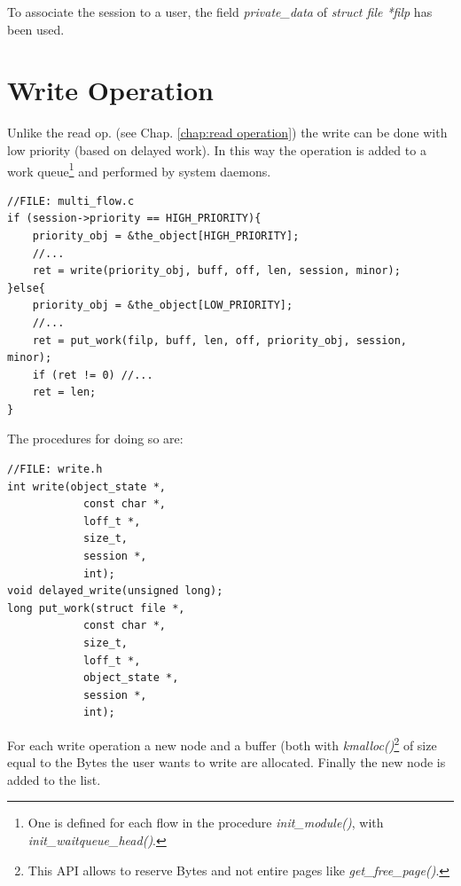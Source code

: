 \documentclass[12pt]{report}
\begin{document}
To associate the session to a user, the field \emph{private\_data} of \emph{struct file *filp} has been used. 



\section{Write Operation}
\label{chap:write operation}

Unlike the read op. (see Chap. \ref{chap:read operation}) the write can be done with low priority (based on delayed work). In this way the operation is added to a work queue\footnote{One is defined for each flow in the procedure \emph{init\_module()}, with  \emph{init\_waitqueue\_head()}.} and performed by system daemons.

\begin{lstlisting}
//FILE: multi_flow.c
if (session->priority == HIGH_PRIORITY){
	priority_obj = &the_object[HIGH_PRIORITY];
	//...	
	ret = write(priority_obj, buff, off, len, session, minor);
}else{
	priority_obj = &the_object[LOW_PRIORITY];
	//...	
	ret = put_work(filp, buff, len, off, priority_obj, session, minor);
	if (ret != 0) //...
	ret = len;
}
\end{lstlisting}

The procedures for doing so are:

\begin{lstlisting}
//FILE: write.h
int write(object_state *, 
			const char *, 
			loff_t *, 
			size_t, 
			session *, 
			int);
void delayed_write(unsigned long);
long put_work(struct file *, 
			const char *, 
			size_t, 
			loff_t *, 
			object_state *, 
			session *, 
			int);
\end{lstlisting}

For each write operation a new node and a buffer (both with \emph{kmalloc()}\footnote{This API allows to reserve Bytes and not entire pages like \emph{get\_free\_page()}.} of size equal to the Bytes the user wants to write are allocated. Finally the new node is added to the list.
\end{document}
